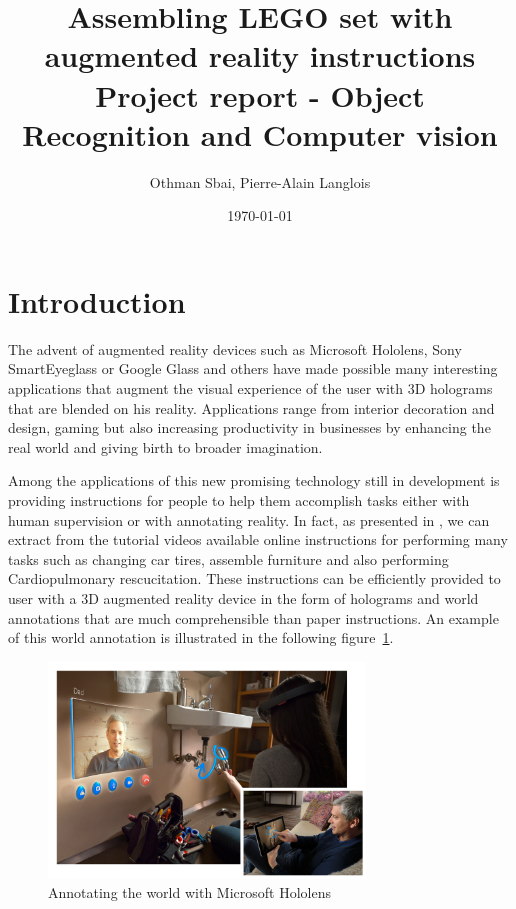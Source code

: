 \documentclass[a4paper,10pt]{article}
\title{%
	Assembling LEGO set with augmented reality instructions\\ \smallbreak
  \large Project report - Object Recognition and Computer vision
}
\author{Othman Sbai, Pierre-Alain Langlois}
\date\today
\begin{document}
\maketitle

\section{Introduction}
The advent of augmented reality devices such as Microsoft Hololens, Sony SmartEyeglass or Google Glass and others have made possible many interesting applications that augment the visual experience of the user with 3D holograms that are blended on his reality. Applications range from interior decoration and design, gaming but also increasing productivity in businesses by enhancing the real world and giving birth to broader imagination.

Among the applications of this new promising technology still in development is providing instructions for people to help them accomplish tasks either with human supervision or with annotating reality. In fact, as presented in \cite{alayrac_unsupervised_2015}, we can extract from the tutorial videos available online instructions for performing many tasks such as changing car tires, assemble furniture and also performing Cardiopulmonary rescucitation. These instructions can be efficiently provided to user with a 3D augmented reality device in the form of holograms and world annotations that are much comprehensible than paper instructions. An example of this world annotation is illustrated in the following figure~\ref{AnnotatingTheWorld}.

\begin{figure}
    \centering
    \includegraphics[width=0.75\textwidth]{Annotating_world_hololens}
    \caption{Annotating the world with Microsoft Hololens}
    \label{AnnotatingTheWorld}
\end{figure}
\end{document}
